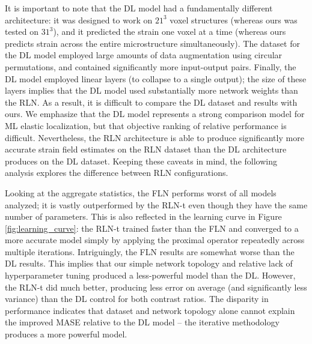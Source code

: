 \documentclass[3p, preprint]{elsarticle}
\newenvironment{revision} {} {}
\begin{document}
\begin{revision}
It is important to note that the DL model had a fundamentally different architecture: it was designed to work on $21^3$ voxel structures (whereas ours was tested on $31^3$), and it predicted the strain one voxel at a time (whereas ours predicts strain across the entire microstructure simultaneously). The dataset for the DL model employed large amounts of data augmentation using circular permutations, and contained significantly more input-output pairs. Finally, the DL model employed linear layers (to collapse to a single output); the size of these layers implies that the DL model used substantially more network weights than the RLN. As a result, it is difficult to compare the DL dataset and results with ours. We emphasize that the DL model represents a strong comparison model for ML elastic localization, but that objective ranking of relative performance is difficult. Nevertheless, the RLN architecture is able to produce significantly more accurate strain field estimates on the RLN dataset than the DL architecture produces on the DL dataset. Keeping these caveats in mind, the following analysis explores the difference between RLN configurations.
\end{revision}

Looking at the aggregate statistics, the FLN performs worst of all models analyzed; it is vastly outperformed by the RLN-t even though they have the same number of parameters.  \begin{revision} This is also reflected in the learning curve in Figure \ref{fig:learning_curve}: the RLN-t trained faster than the FLN and converged to a more accurate model simply by applying the proximal operator repeatedly across multiple iterations. Intriguingly, the FLN results are somewhat worse than the DL results. This implies that our simple network topology and relative lack of hyperparameter tuning produced a less-powerful model than the DL.
\end{revision}
However, the RLN-t did much better, producing less error on average (and significantly less variance) than the DL control for both contrast ratios. \begin{revision}
The disparity in performance indicates that dataset and network topology alone cannot explain the improved MASE relative to the DL model -- the iterative methodology produces a more powerful model.
\end{revision}
\end{document}
